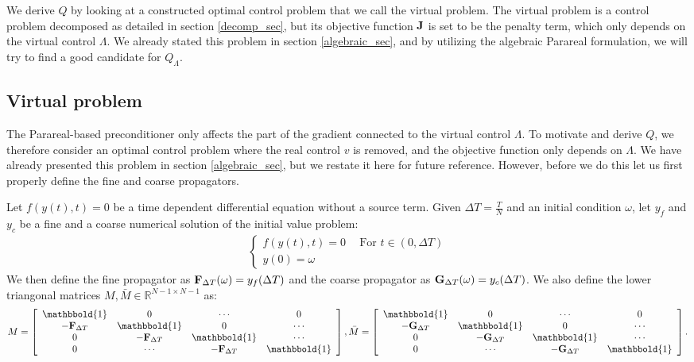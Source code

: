 \\
\\
We derive $Q$ by looking at a constructed optimal control problem that we call the virtual problem. The virtual problem is a control problem decomposed as detailed in section \ref{decomp_sec}, but its objective function $\bold J$ is set to be the penalty term, which only depends on the virtual control $\Lambda$. We already stated this problem in section \ref{algebraic_sec}, and by utilizing the algebraic Parareal formulation, we will try to find a good candidate for $Q_{\Lambda}$.
\subsection{Virtual problem} \label{vir_sec}
The Parareal-based preconditioner only affects the part of the gradient connected to the virtual control $\Lambda$. To motivate and derive $Q$, we therefore consider an optimal control problem where the real control $v$ is removed, and the objective function only depends on $\Lambda$. We have already presented this problem in section \ref{algebraic_sec}, but we restate it here for future reference. However, before we do this let us first properly define the fine and coarse propagators.
\begin{definition} \label{prop_def}
Let $f(y(t),t)=0$ be a time dependent differential equation without a source term. Given $\Delta T=\frac{T}{N}$ and an initial condition $\omega$, let $y_f$ and $y_c$ be a fine and a coarse numerical solution of the initial value problem:
\begin{align}
 \left\{
     \begin{array}{lr}
		f(y(t),t)=0 \ \quad \textrm{For $t \in (0,\Delta T)$} \\
		y(0)=\omega
	\end{array}
	\right.	
\end{align}
We then define the fine propagator as $\bold F_{\Delta T}(\omega) = y_f(\Delta T)$ and the coarse propagator as $\bold G_{\Delta T}(\omega) = y_c(\Delta T)$. We also define the lower triangonal matrices $M,\bar M\in\mathbb{R}^{N-1\times N-1}$ as: 
\begin{align*}
M= \left[ \begin{array}{cccc}
   \mathbbold{1} & 0 & \cdots & 0 \\  
   -\bold{F}_{\Delta T} & \mathbbold{1} & 0 & \cdots \\ 
   0 &-\bold{F}_{\Delta T} & \mathbbold{1}  & \cdots \\
   0 &\cdots &-\bold{F}_{\Delta T} & \mathbbold{1}  \\
   \end{array}  \right],
\bar M= \left[ \begin{array}{cccc}
   \mathbbold{1} & 0 & \cdots & 0 \\  
   -\bold{G}_{\Delta T} & \mathbbold{1} & 0 & \cdots \\ 
   0 &-\bold{G}_{\Delta T} & \mathbbold{1}  & \cdots \\
   0 &\cdots &-\bold{G}_{\Delta T} & \mathbbold{1}   \\
   \end{array}  \right].
\end{align*}
\end{definition}
